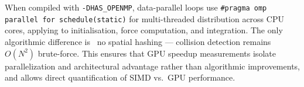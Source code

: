 When compiled with \texttt{-DHAS\_OPENMP}, data-parallel loops use
\texttt{\#pragma omp parallel for schedule(static)} for multi-threaded
distribution across CPU cores, applying to initialisation, force computation,
and integration. The only algorithmic difference is ~no spatial hashing --- 
collision detection remains $O(N^2)$ brute-force. This ensures that GPU speedup 
measurements isolate parallelization and architectural advantage rather than 
algorithmic improvements, and allows direct quantification of SIMD vs.~GPU performance.